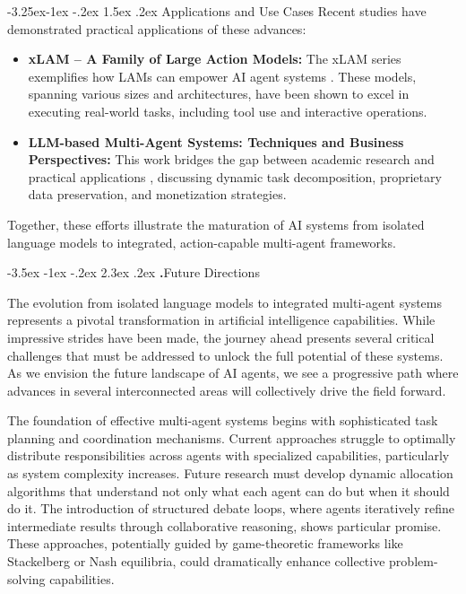 \documentclass[journal,twoside,10pt]{IEEEtran}
\makeatletter
\renewcommand\section{\@startsection{section}{1}{\z@}%
                       {-3.5ex \@plus -1ex \@minus -.2ex}%
                       {2.3ex \@plus.2ex}%
                       {\normalfont\Large\bfseries\Roman{section}.\quad}}
\renewcommand\subsection{\@startsection{subsection}{2}{\z@}%
                       {-3.25ex\@plus -1ex \@minus -.2ex}%
                       {1.5ex \@plus .2ex}%
                       {\normalfont\large\bfseries}}
\makeatother
\begin{document}
\subsection{Applications and Use Cases}
Recent studies have demonstrated practical applications of these advances:

\begin{itemize}
    \item \textbf{xLAM – A Family of Large Action Models:} The xLAM series exemplifies how LAMs can empower AI agent systems \cite{zhang2024xlam}. These models, spanning various sizes and architectures, have been shown to excel in executing real-world tasks, including tool use and interactive operations.
    \item \textbf{LLM-based Multi-Agent Systems: Techniques and Business Perspectives:} This work bridges the gap between academic research and practical applications \cite{yang2024llmbased}, discussing dynamic task decomposition, proprietary data preservation, and monetization strategies.
\end{itemize}

Together, these efforts illustrate the maturation of AI systems from isolated language models to integrated, action-capable multi-agent frameworks.

\section{Future Directions}


The evolution from isolated language models to integrated multi-agent systems represents a pivotal transformation in artificial intelligence capabilities. While impressive strides have been made, the journey ahead presents several critical challenges that must be addressed to unlock the full potential of these systems. As we envision the future landscape of AI agents, we see a progressive path where advances in several interconnected areas will collectively drive the field forward.

The foundation of effective multi-agent systems begins with sophisticated task planning and coordination mechanisms. Current approaches struggle to optimally distribute responsibilities across agents with specialized capabilities, particularly as system complexity increases. Future research must develop dynamic allocation algorithms that understand not only what each agent can do but when it should do it. The introduction of structured debate loops, where agents iteratively refine intermediate results through collaborative reasoning, shows particular promise. These approaches, potentially guided by game-theoretic frameworks like Stackelberg or Nash equilibria, could dramatically enhance collective problem-solving capabilities.
\end{document}

